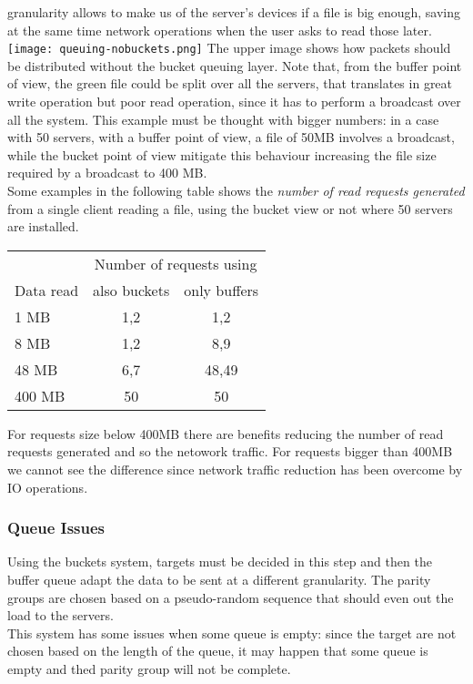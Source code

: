 granularity allows to make us of the server's devices if a file is big enough,
saving at the same time network operations when the user asks to read those
later.\\
\texttt{[image: queuing-nobuckets.png]}
The upper image shows how packets should be distributed without the bucket queuing layer.
Note that, from the buffer point of view, the green file could be
split over all the servers, that translates in great write operation but poor
read operation, since it has to perform a broadcast over all the system. This
example must be thought with bigger numbers: in a case with 50 servers, with a
buffer point of view, a file of 50MB involves a broadcast, while the bucket
point of view mitigate this behaviour increasing the file size required by a
broadcast to 400 MB. \\
Some examples in the following table shows the \textit{number of read requests generated}
from a single client reading a file, using the bucket view or not where 50 servers are installed.

\vspace{0.5cm}
\begin{tabular}{l | c | c}
    & \multicolumn{2}{|c}{Number of requests using} \\
    Data read & also buckets & only buffers \\ \hline
    1 MB & 1,2 & 1,2 \\
    8 MB & 1,2 & 8,9 \\
    48 MB& 6,7 & 48,49 \\
    400 MB & 50 & 50 \\
\end{tabular}
\vspace{0.5cm}

For requests size below 400MB there are benefits reducing the number of read
requests generated and so the netowork traffic. For requests bigger than 400MB
we cannot see the difference since network traffic reduction has been overcome
by IO operations.

\subsubsection{Queue Issues}
Using the buckets system, targets must be decided in this step and then the
buffer queue adapt the data to be sent at a different granularity.
The parity groups are chosen based on a pseudo-random sequence that should
even out the load to the servers. \\
This system has some issues when some queue is empty: since the target are
not chosen based on the length of the queue, it may happen that some queue is
empty and thed parity group will not be complete. \\

